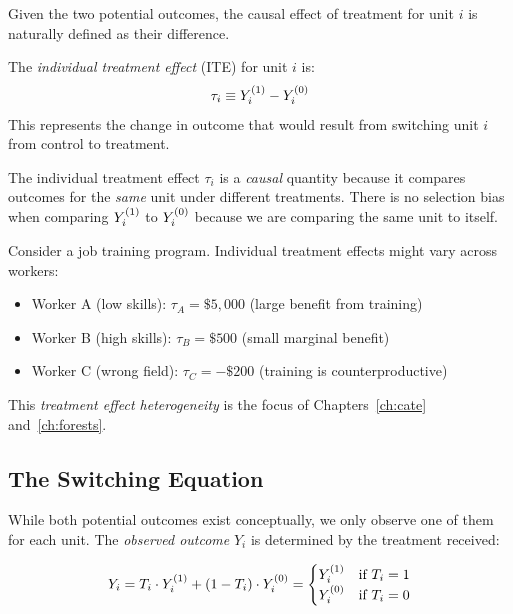 Given the two potential outcomes, the causal effect of treatment for unit $i$ is naturally defined as their difference.

\begin{definition}
\label{def:ite}
The \emph{individual treatment effect} (ITE) for unit $i$ is:
\begin{equation}
\tau_i \equiv Y^{(1)}_i - Y^{(0)}_i
\label{eq:ite}
\end{equation}
This represents the change in outcome that would result from switching unit $i$ from control to treatment.
\end{definition}

The individual treatment effect $\tau_i$ is a \emph{causal} quantity because it compares outcomes for the \emph{same} unit under different treatments. There is no selection bias when comparing $Y^{(1)}_i$ to $Y^{(0)}_i$ because we are comparing the same unit to itself.

\begin{example}
\label{ex:heterogeneous}
Consider a job training program. Individual treatment effects might vary across workers:
\begin{itemize}
    \item Worker A (low skills): $\tau_A = \$5{,}000$ (large benefit from training)
    \item Worker B (high skills): $\tau_B = \$500$ (small marginal benefit)
    \item Worker C (wrong field): $\tau_C = -\$200$ (training is counterproductive)
\end{itemize}
This \emph{treatment effect heterogeneity} is the focus of Chapters~\ref{ch:cate} and~\ref{ch:forests}.
\end{example}

\subsection{The Switching Equation}

While both potential outcomes exist conceptually, we only observe one of them for each unit. The \emph{observed outcome} $Y_i$ is determined by the treatment received:

\begin{equation}
Y_i = T_i \cdot Y^{(1)}_i + (1 - T_i) \cdot Y^{(0)}_i =
\begin{cases}
Y^{(1)}_i & \text{if } T_i = 1 \\
Y^{(0)}_i & \text{if } T_i = 0
\end{cases}
\label{eq:switching}
\end{equation}

